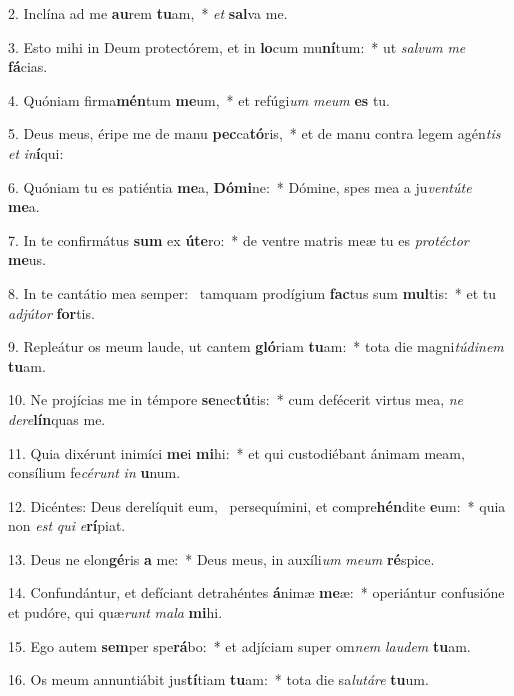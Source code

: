 2. Inclína ad me \textbf{au}rem \textbf{tu}am,~*  \textit{et} \textbf{sal}va me.\

3. Esto mihi in Deum protectórem, et in \textbf{lo}cum mu\textbf{ní}tum:~*  ut \textit{sal}\textit{vum} \textit{me} \textbf{fá}cias.\

4. Quóniam firma\textbf{mén}tum \textbf{me}um,~*  et refúgi\textit{um} \textit{me}\textit{um} \textbf{es} tu.\

5. Deus meus, éripe me de manu \textbf{pec}ca\textbf{tó}ris,~*  et de manu contra legem agén\textit{tis} \textit{et} \textit{in}\textbf{í}qui:\

6. Quóniam tu es patiéntia \textbf{me}a, \textbf{Dó}\textbf{mi}ne:~*  Dómine, spes mea a ju\textit{ven}\textit{tú}\textit{te} \textbf{me}a.\

7. In te confirmátus \textbf{sum} ex \textbf{ú}\textbf{te}ro:~*  de ventre matris meæ tu es \textit{pro}\textit{téc}\textit{tor} \textbf{me}us.\

8. In te cantátio mea semper: \dag\  tamquam prodígium \textbf{fac}tus sum \textbf{mul}tis:~*  et tu \textit{ad}\textit{jú}\textit{tor} \textbf{for}tis.\

9. Repleátur os meum laude, ut cantem \textbf{gló}riam \textbf{tu}am:~*  tota die magni\textit{tú}\textit{di}\textit{nem} \textbf{tu}am.\

10. Ne projícias me in témpore \textbf{se}nec\textbf{tú}tis:~*  cum defécerit virtus mea, \textit{ne} \textit{de}\textit{re}\textbf{lín}quas me.\

11. Quia dixérunt inimíci \textbf{me}i \textbf{mi}hi:~*  et qui custodiébant ánimam meam, consílium fe\textit{cé}\textit{runt} \textit{in} \textbf{u}num.\

12. Dicéntes: Deus derelíquit eum, \dag\  persequímini, et compre\textbf{hén}dite \textbf{e}um:~*  quia non \textit{est} \textit{qui} \textit{e}\textbf{rí}piat.\

13. Deus ne elon\textbf{gé}ris \textbf{a} me:~*  Deus meus, in auxíli\textit{um} \textit{me}\textit{um} \textbf{ré}spice.\

14. Confundántur, et defíciant detrahéntes \textbf{á}nimæ \textbf{me}æ:~*  operiántur confusióne et pudóre, qui quæ\textit{runt} \textit{ma}\textit{la} \textbf{mi}hi.\

15. Ego autem \textbf{sem}per spe\textbf{rá}bo:~*  et adjíciam super om\textit{nem} \textit{lau}\textit{dem} \textbf{tu}am.\

16. Os meum annuntiábit jus\textbf{tí}tiam \textbf{tu}am:~*  tota die sa\textit{lu}\textit{tá}\textit{re} \textbf{tu}um.\

